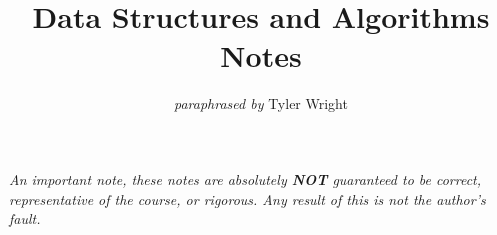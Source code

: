 \documentclass[a4paper, 12pt, twoside]{article}
\begin{document}
\title{Data Structures and Algorithms Notes}
\date{}
\author{\textit{paraphrased by} Tyler Wright}
\maketitle

\vfill

\textit{An important note, these notes are absolutely \textbf{NOT}
  guaranteed to be correct, representative of the course, or rigorous.
  Any result of this is not the author's fault.}

\addtocounter{section}{-1}



\newpage

\tableofcontents














\end{document}
